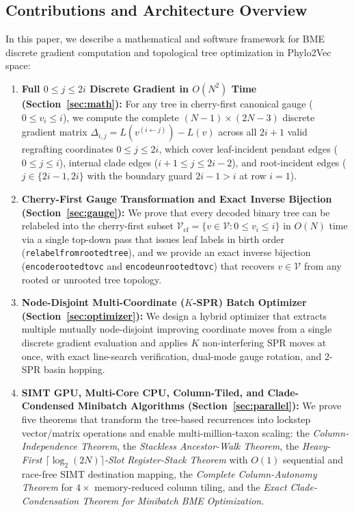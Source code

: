 \documentclass[11pt,a4paper]{article}
\makeatletter
\DeclareRobustCommand{\_}{\ifmmode\nfss@text{\textunderscore}\else\textunderscore\allowbreak\fi}
\theoremstyle{definition}
\makeatother
\begin{document}
\subsection{Contributions and Architecture Overview}
In this paper, we describe a mathematical and software framework for BME discrete gradient computation and topological tree optimization in Phylo2Vec space:
\begin{enumerate}
    \item \textbf{Full $0 \le j \le 2i$ Discrete Gradient in $O(N^2)$ Time (Section~\ref{sec:math}):} For any tree in cherry-first canonical gauge ($0 \le v_i \le i$), we compute the complete $(N-1) \times (2N-3)$ discrete gradient matrix $\Delta_{i,j} = L(v^{(i \leftarrow j)}) - L(v)$ across all $2i+1$ valid regrafting coordinates $0 \le j \le 2i$, which cover leaf-incident pendant edges ($0 \le j \le i$), internal clade edges ($i+1 \le j \le 2i-2$), and root-incident edges ($j \in \{2i-1, 2i\}$ with the boundary guard $2i-1 > i$ at row $i=1$).
    \item \textbf{Cherry-First Gauge Transformation and Exact Inverse Bijection (Section~\ref{sec:gauge}):} We prove that every decoded binary tree can be relabeled into the cherry-first subset $\mathcal{V}_{\text{cf}} = \{v \in \mathcal{V} : 0 \le v_i \le i\}$ in $O(N)$ time via a single top-down pass that issues leaf labels in birth order (\texttt{relabel\_from\_rooted\_tree}), and we provide an exact inverse bijection (\texttt{encode\_rooted\_to\_v\_c} and \texttt{encode\_unrooted\_to\_v\_c}) that recovers $v \in \mathcal{V}$ from any rooted or unrooted tree topology.
    \item \textbf{Node-Disjoint Multi-Coordinate ($K$-SPR) Batch Optimizer (Section~\ref{sec:optimizer}):} We design a hybrid optimizer that extracts multiple mutually node-disjoint improving coordinate moves from a single discrete gradient evaluation and applies $K$ non-interfering SPR moves at once, with exact line-search verification, dual-mode gauge rotation, and 2-SPR basin hopping.
    \item \textbf{SIMT GPU, Multi-Core CPU, Column-Tiled, and Clade-Condensed Minibatch Algorithms (Section~\ref{sec:parallel}):} We prove five theorems that transform the tree-based recurrences into lockstep vector/matrix operations and enable multi-million-taxon scaling: the \emph{Column-Independence Theorem}, the \emph{Stackless Ancestor-Walk Theorem}, the \emph{Heavy-First $\lceil \log_2(2N) \rceil$-Slot Register-Stack Theorem} with $O(1)$ sequential and race-free SIMT destination mapping, the \emph{Complete Column-Autonomy Theorem} for $4\times$ memory-reduced column tiling, and the \emph{Exact Clade-Condensation Theorem for Minibatch BME Optimization}.
\end{enumerate}
\end{document}
